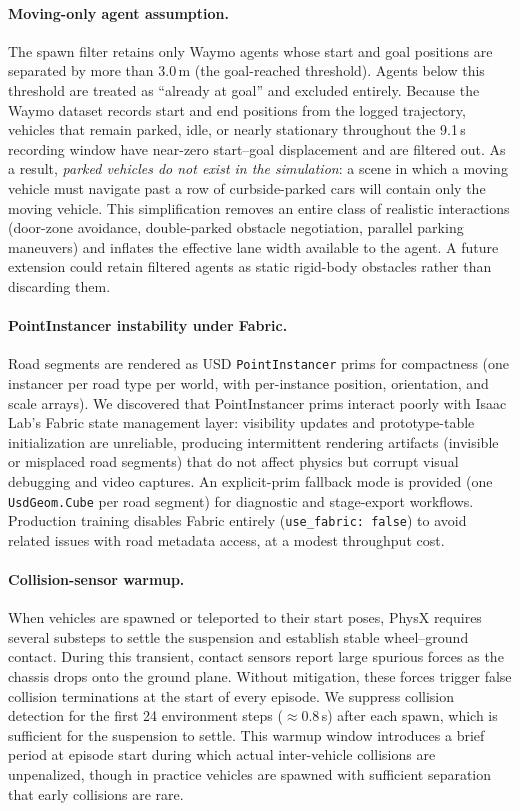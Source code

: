 \paragraph{Moving-only agent assumption.}
The spawn filter retains only Waymo agents whose start and goal positions are separated by more than 3.0\,m (the goal-reached threshold).
Agents below this threshold are treated as ``already at goal'' and excluded entirely.
Because the Waymo dataset records start and end positions from the logged trajectory, vehicles that remain parked, idle, or nearly stationary throughout the 9.1\,s recording window have near-zero start--goal displacement and are filtered out.
As a result, \emph{parked vehicles do not exist in the simulation}: a scene in which a moving vehicle must navigate past a row of curbside-parked cars will contain only the moving vehicle.
This simplification removes an entire class of realistic interactions (door-zone avoidance, double-parked obstacle negotiation, parallel parking maneuvers) and inflates the effective lane width available to the agent.
A future extension could retain filtered agents as static rigid-body obstacles rather than discarding them.

\paragraph{PointInstancer instability under Fabric.}
Road segments are rendered as USD \texttt{PointInstancer} prims for compactness (one instancer per road type per world, with per-instance position, orientation, and scale arrays).
We discovered that PointInstancer prims interact poorly with Isaac Lab's Fabric state management layer: visibility updates and prototype-table initialization are unreliable, producing intermittent rendering artifacts (invisible or misplaced road segments) that do not affect physics but corrupt visual debugging and video captures.
An explicit-prim fallback mode is provided (one \texttt{UsdGeom.Cube} per road segment) for diagnostic and stage-export workflows.
Production training disables Fabric entirely (\texttt{use\_fabric: false}) to avoid related issues with road metadata access, at a modest throughput cost.

\paragraph{Collision-sensor warmup.}
When vehicles are spawned or teleported to their start poses, PhysX requires several substeps to settle the suspension and establish stable wheel--ground contact.
During this transient, contact sensors report large spurious forces as the chassis drops onto the ground plane.
Without mitigation, these forces trigger false collision terminations at the start of every episode.
We suppress collision detection for the first 24 environment steps (${\approx}0.8$\,s) after each spawn, which is sufficient for the suspension to settle.
This warmup window introduces a brief period at episode start during which actual inter-vehicle collisions are unpenalized, though in practice vehicles are spawned with sufficient separation that early collisions are rare.

